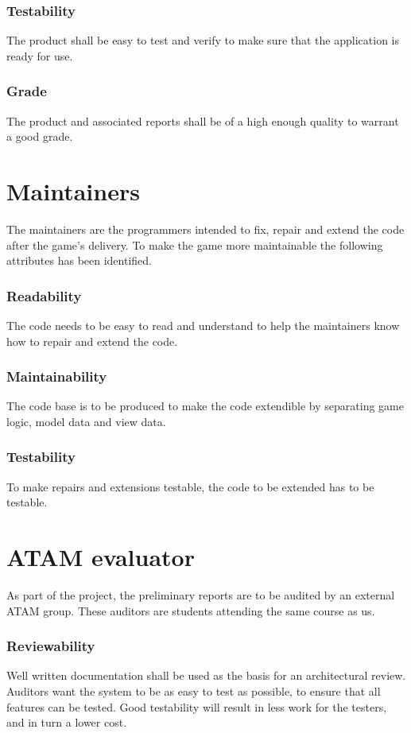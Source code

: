         \subsubsection*{Testability}
        The product shall be easy to test and verify to make sure that the application is ready for use.

        \subsubsection*{Grade}
        The product and associated reports shall be of a high enough quality to warrant a good grade.

    \section{Maintainers}
    The maintainers are the programmers intended to fix, repair and extend the code after the game's delivery. To make the game more maintainable the following attributes has been identified.

        \subsubsection*{Readability}
        The code needs to be easy to read and understand to help the maintainers know how to repair and extend the code.

        \subsubsection*{Maintainability}
        The code base is to be produced to make the code extendible by separating game logic, model data and view data.

        \subsubsection*{Testability}
        To make repairs and extensions testable, the code to be extended has to be testable.

    
    
    \section{ATAM evaluator}
    As part of the project, the preliminary reports are to be audited by an external ATAM group. These auditors are students attending the same course as us.

        \subsubsection*{Reviewability}
        Well written documentation shall be used as the basis for an architectural review. Auditors want the system to be as easy to test as possible, to ensure that all features can be tested. Good testability will result in less work for the testers, and in turn a lower cost.


